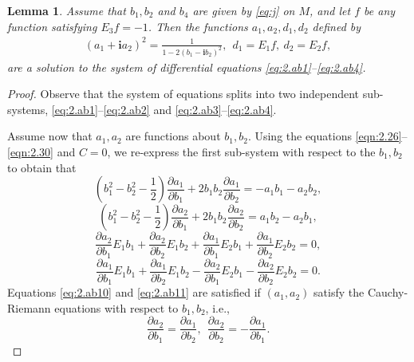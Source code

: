 \documentclass[reqno]{amsart}%
\newtheorem{lemma}[theorem]{Lemma}
\theoremstyle{definition}
\numberwithin{equation}{section}
\begin{document}
\begin{lemma}\label{lemma:2.1a2}
Assume that $b_1,b_2$ and $b_4$ are given by \eqref{eq:j} on $M$,
and let $f$ be any function satisfying $E_3f=-1$. Then the functions $a_1,a_2,d_1,d_2$ defined by
\begin{equation}\label{eq:2.ab7}
\begin{aligned}
(a_1+\mathbf{i}a_2)^2=\frac{1}{1-2(b_1-\mathbf{i}b_2)^2}, \ \ d_1=E_1f,\ d_2=E_2f,
\end{aligned}
\end{equation}
are a solution to the system of differential equations \eqref{eq:2.ab1}--\eqref{eq:2.ab4}.
\end{lemma}
%
\begin{proof}
Observe that the system of equations splits into two independent
sub-systems, \eqref{eq:2.ab1}--\eqref{eq:2.ab2} and \eqref{eq:2.ab3}--\eqref{eq:2.ab4}.

Assume now that $a_1,a_2$ are functions about $b_1,b_2$. Using the equations
\eqref{eqn:2.26}--\eqref{eqn:2.30} and $C=0$, we re-express the first sub-system with respect to
the $b_1,b_2$ to obtain that
%
\begin{equation}\label{eq:2.ab8}
(b_1^2-b_2^2-\frac{1}{2})\frac{\partial a_1}{\partial b_1}+2b_1b_2\frac{\partial a_1}{\partial b_2}
=-a_1b_1-a_2b_2,
\end{equation}
%
\begin{equation}\label{eq:2.ab9}
(b_1^2-b_2^2-\frac{1}{2})\frac{\partial a_2}{\partial b_1}+2b_1b_2\frac{\partial a_2}{\partial b_2}
=a_1b_2-a_2b_1,
\end{equation}
%
\begin{equation}\label{eq:2.ab10}
\frac{\partial a_2}{\partial b_1}E_1b_1+\frac{\partial a_2}{\partial b_2}E_1b_2
+\frac{\partial a_1}{\partial b_1}E_2b_1+\frac{\partial a_1}{\partial b_2}E_2b_2=0,
\end{equation}
%
\begin{equation}\label{eq:2.ab11}
\frac{\partial a_1}{\partial b_1}E_1b_1+\frac{\partial a_1}{\partial b_2}E_1b_2
-\frac{\partial a_2}{\partial b_1}E_2b_1-\frac{\partial a_2}{\partial b_2}E_2b_2=0.
\end{equation}
Equations \eqref{eq:2.ab10} and \eqref{eq:2.ab11} are satisfied if $(a_1,a_2)$ satisfy the Cauchy-Riemann equations with respect to $b_1,b_2$, i.e.,
$$
\frac{\partial a_2}{\partial b_1}=\frac{\partial a_1}{\partial b_2},\ \
\frac{\partial a_2}{\partial b_2}=-\frac{\partial a_1}{\partial b_1}.
$$


\end{proof}
\end{document}
